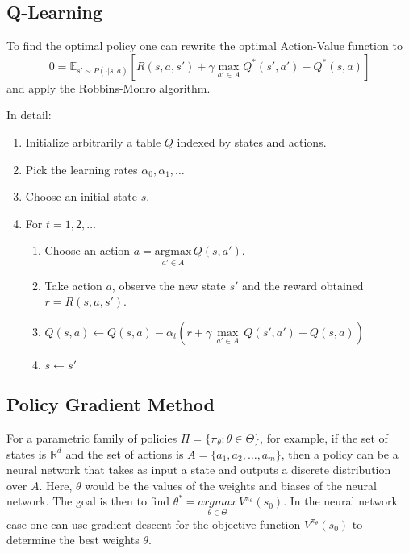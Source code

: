 \subsection{Q-Learning}

To find the optimal policy one can rewrite the optimal Action-Value function to
\begin{equation*}
    0 = \mathbb{E}_{s'\sim P(\cdot|s,a)}\left[R(s,a,s') + \gamma \max_{a'\in A}Q^* (s',a') - Q^*(s,a)\right]
\end{equation*}
and apply the Robbins-Monro algorithm.


\newpar{}
In detail:
\begin{enumerate}
    \item Initialize arbitrarily a table $Q$ indexed by states and actions.
    \item Pick the learning rates $\alpha_0, \alpha_1, \ldots$
    \item Choose an initial state $s$.
    \item For $t = 1, 2, \ldots$
          \begin{enumerate}
              \item Choose an action $a = \underset{a'\in A}{\mathrm{argmax}}\,Q(s,a')$.
              \item Take action $a$, observe the new state $s'$ and the reward obtained $r=R(s,a,s')$.
              \item $Q(s,a) \leftarrow Q(s,a) - \alpha_t \left(r + \gamma\,\underset{a'\in A}{\max}\,Q(s',a')-Q(s,a)\right)$
              \item $s \leftarrow s'$
          \end{enumerate}
\end{enumerate}

\subsection{Policy Gradient Method}
For a parametric family of policies $\Pi = \{\pi_\theta:\theta\in\Theta\}$, for example, if the set of states is $\mathbb{R}^d$ and
the set of actions is $A = \{a_1, a_2, \ldots, a_m\}$, then a policy can be a neural network that takes as input a state and outputs a discrete distribution over $A$. Here, $\theta$ would be the values of the weights and biases of the neural network.
\newpar{}
The goal is then to find $\theta^* = \underset{\theta\in\Theta}{argmax}\,V^{\pi_\theta}(s_0)$.
\newpar{}
In the neural network case one can use gradient descent for the objective function $V^{\pi_\theta}(s_0)$ to determine the best weights $\theta$.
